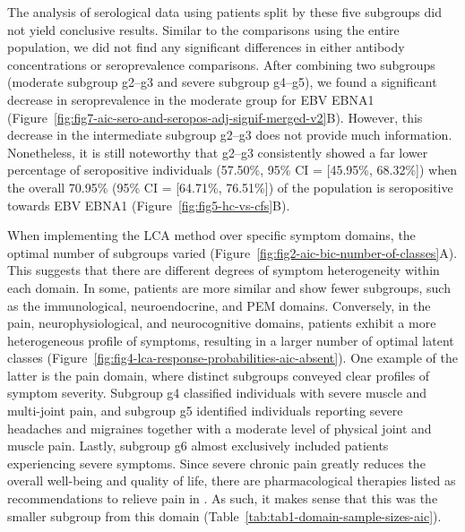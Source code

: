 The analysis of serological data using patients split by these five subgroups did not yield conclusive results.
Similar to the comparisons using the entire \cfs population, we did not find any significant differences in either antibody concentrations or seroprevalence comparisons.
After combining two subgroups (moderate subgroup g2--g3 and severe subgroup g4--g5), we found a significant decrease in seroprevalence in the moderate group for EBV EBNA1 (Figure~\ref{fig:fig7-aic-sero-and-seropos-adj-signif-merged-v2}B).
However, this decrease in the intermediate subgroup g2--g3 does not provide much information.
Nonetheless, it is still noteworthy that g2--g3 consistently showed a far lower percentage of seropositive individuals (57.50\%, 95\% CI = [45.95\%, 68.32\%]) when the overall 70.95\% (95\% CI = [64.71\%, 76.51\%]) of the \cfs population is seropositive towards EBV EBNA1 (Figure~\ref{fig:fig5-hc-vs-cfs}B).

When implementing the LCA method over specific symptom domains, the optimal number of subgroups varied (Figure~\ref{fig:fig2-aic-bic-number-of-classes}A).
This suggests that there are different degrees of symptom heterogeneity within each domain.
In some, patients are more similar and show fewer subgroups, such as the immunological, neuroendocrine, and PEM domains.
Conversely, in the pain, neurophysiological, and neurocognitive domains, \cfs patients exhibit a more heterogeneous profile of symptoms, resulting in a larger number of optimal latent classes (Figure~\ref{fig:fig4-lca-response-probabilities-aic-absent}).
One example of the latter is the pain domain, where distinct subgroups conveyed clear profiles of symptom severity.
Subgroup g4 classified individuals with severe muscle and multi-joint pain, and subgroup g5 identified individuals reporting severe headaches and migraines together with a moderate level of physical joint and muscle pain.
Lastly, subgroup g6 almost exclusively included patients experiencing severe symptoms.
Since severe chronic pain greatly reduces the overall well-being and quality of life, there are pharmacological therapies listed as recommendations to relieve pain in \cfs \citep{niceguideline2021OverviewMyalgic}.
As such, it makes sense that this was the smaller subgroup from this domain (Table~\ref{tab:tab1-domain-sample-sizes-aic}).

